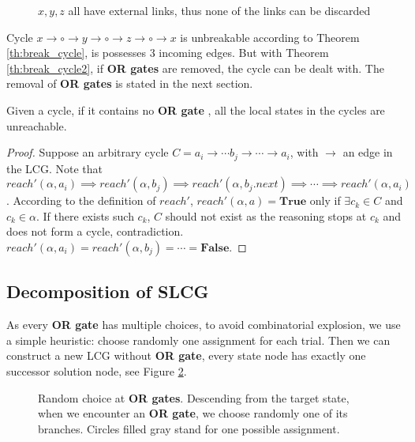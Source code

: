 \begin{example}\label{example:cycles}
    \begin{figure}[ht]
        \centering
        
        \caption[Removal of cycles]{$x,y,z$ all have external links, thus none of the links can be discarded}
        \label{cycle3}
    \end{figure}
    
    Cycle $x\to \circ \to y \to \circ \to z\to \circ \to x$ is unbreakable according to Theorem \ref{th:break_cycle}, is possesses 3 incoming edges.
    But with Theorem \ref{th:break_cycle2}, if \textbf{OR gates} are removed, the cycle can be dealt with.
    The removal of \textbf{OR gates} is stated in the next section.
\end{example}

\begin{theorem}\label{th:break_cycle2}
Given a cycle, if it contains no \textbf{OR gate}%
, all the local states in the cycles are unreachable.
\end{theorem}

\begin{proof}
Suppose an arbitrary cycle $C=a_i\to \cdots b_j\to\cdots \to a_i$, with $\to$ an edge in the LCG.
Note that $reach'(\alpha,a_i)\implies reach'(\alpha,b_j)\implies reach'(\alpha,b_j.next)\implies \cdots\implies reach'(\alpha,a_i)$.
According to the definition of $reach'$, $reach'(\alpha,a)=\mathbf{True}$ only if $\exists c_k\in C$ and $c_k\in \alpha$.
If there exists such $c_k$, $C$ should not exist as the reasoning stops at $c_k$ and does not form a cycle, contradiction.
$reach'(\alpha,a_i)=reach'(\alpha,b_j)=\cdots =\mathbf{False}$.
\end{proof}
\subsection{Decomposition of SLCG}
As every \textbf{OR gate} has multiple choices, to avoid combinatorial explosion, we use a simple heuristic: 
choose randomly one assignment for each trial.
Then we can construct a new LCG without \textbf{OR gate}, every state node has exactly one successor solution node, see Figure \ref{fig:heuristics}.
\begin{figure}[ht]
    \centering
    
    \caption[Random choice at \textbf{OR gates}]{Random choice at \textbf{OR gates}. Descending from the target state, when we encounter an \textbf{OR gate}, we choose randomly one of its branches. Circles filled gray stand for one possible assignment.}
    \label{fig:heuristics}
\end{figure}
